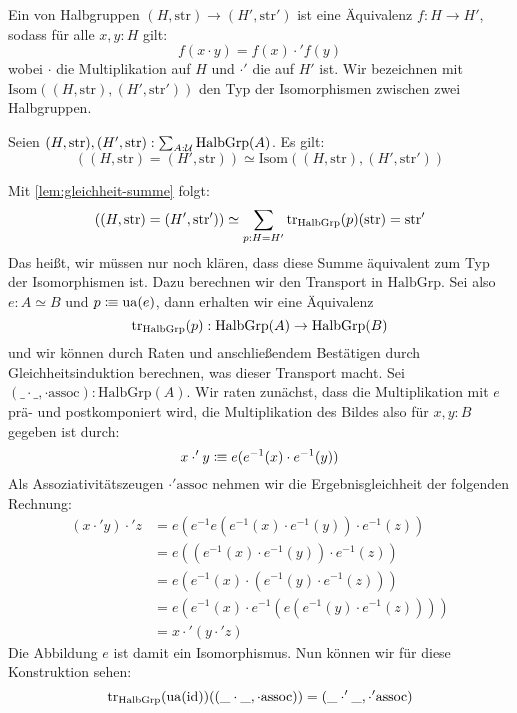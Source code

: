 \begin{definition}
  Ein  von Halbgruppen $(H, \mathrm{str}) \to (H',\mathrm{str}')$ ist eine Äquivalenz $f:H\to H'$, sodass für alle $x,y:H$ gilt:
  \[
    f(x \cdot y) = f(x) \cdot' f(y)
  \]
  wobei $\cdot$ die Multiplikation auf $H$ und $\cdot'$ die auf $H'$ ist.
  Wir bezeichnen mit $\mathrm{Isom}((H, \mathrm{str}), (H',\mathrm{str}'))$ den Typ der Isomorphismen zwischen zwei Halbgruppen.
\end{definition}

\begin{theorem}
  Seien $(H,\mathrm{str}),(H',\mathrm{str}):\sum_{A:\mathcal{U}}\mathrm{HalbGrp}(A)$. Es gilt:
  \[
    \left((H,\mathrm{str})=(H',\mathrm{str})\right)\simeq\mathrm{Isom}((H, \mathrm{str}), (H',\mathrm{str}'))
  \]
\end{theorem}
\begin{beweis}
  Mit \cref{lem:gleichheit-summe} folgt:
  \[
    \left((H,\mathrm{str})=(H',\mathrm{str}')\right)\simeq \sum_{p:H=H'}\mathrm{tr}_{\mathrm{HalbGrp}}(p)(\mathrm{str})=\mathrm{str}'
  \]
  Das heißt, wir müssen nur noch klären, dass diese Summe äquivalent zum Typ der Isomorphismen ist.
  Dazu berechnen wir den Transport in $\mathrm{HalbGrp}$.
  Sei also $e:A\simeq B$ und $p\vcentcolon\mspace{-1.2mu}\equiv\mathrm{ua}(e)$, dann erhalten wir eine Äquivalenz
  \[
    \mathrm{tr}_{\mathrm{HalbGrp}}(p):\mathrm{HalbGrp}(A) \to \mathrm{HalbGrp}(B)
  \]
  und wir können durch Raten und anschließendem Bestätigen durch Gleichheitsinduktion berechnen, was dieser Transport macht.
  Sei $(\_\cdot\_, \cdot\mathrm{assoc}):\mathrm{HalbGrp}(A)$.
  Wir raten zunächst, dass die Multiplikation mit $e$ prä- und postkomponiert wird, die Multiplikation des Bildes also für $x,y:B$ gegeben ist durch:
  \[
    x \cdot' y \vcentcolon\mspace{-1.2mu}\equiv e(e^{-1}(x) \cdot e^{-1}(y))
  \]
  Als Assoziativitätszeugen $\cdot'\mathrm{assoc}$ nehmen wir die Ergebnisgleichheit der folgenden Rechnung:
  \begin{align*}
    (x \cdot' y) \cdot' z & = e(e^{-1}e(e^{-1}(x)\cdot e^{-1}(y)) \cdot e^{-1}(z)) \\
                          & = e((e^{-1}(x)\cdot e^{-1}(y)) \cdot e^{-1}(z)) \\
                          & = e (e^{-1}(x)\cdot (e^{-1}(y) \cdot e^{-1}(z))) \\
                          & = e (e^{-1}(x)\cdot e^{-1}(e(e^{-1}(y) \cdot e^{-1}(z)))) \\
                          & =x \cdot' (y \cdot' z)
  \end{align*}
  Die Abbildung $e$ ist damit ein Isomorphismus.
  Nun können wir für diese Konstruktion sehen:
  \[
    \mathrm{tr}_{\mathrm{HalbGrp}}(\mathrm{ua}(\mathrm{id}))((\_\cdot\_,\cdot\mathrm{assoc}))=(\_\cdot'\_,\cdot'\mathrm{assoc})
  \]
\end{beweis}
